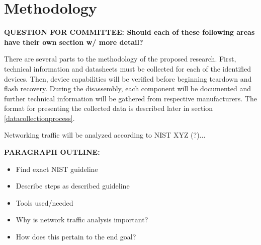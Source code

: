 

\section{Methodology}  \label{methodology}

\textbf{QUESTION FOR COMMITTEE: Should each of these following areas have their own section w/ more detail?}  

There are several parts to the methodology of the proposed research. First, technical information and datasheets must be collected for each of the identified devices. Then, device capabilities will be verified before beginning teardown and flash recovery. During the disassembly, each component will be documented and further technical information will be gathered from respective manufacturers. The format for presenting the collected data is described later in section \ref{datacollectionprocess}.

Networking traffic will be analyzed according to NIST XYZ (?)...

\textbf{PARAGRAPH OUTLINE:}
\begin{itemize}
  \item Find exact NIST guideline
  \item Describe steps as described guideline
  \item Tools used/needed
  \item Why is network traffic analysis important?
  \item How does this pertain to the end goal?
\end{itemize}

